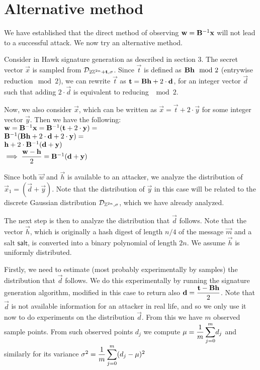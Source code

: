 \chapter{Alternative method}

We have established that the direct method of observing $\mathbf{w} = \mathbf{B}^{-1} \mathbf{x}$ will not lead to a successful attack.
We now try an alternative method.

Consider in Hawk signature generation as described in section 3.
The secret vector $\vec{x}$ is sampled from $\mathcal{D}_{2\mathbb{Z}^{2n} + \mathbf{t}, \sigma}$.
Since $\vec{t}$ is defined as $\mathbf{B}\mathbf{h}\mod 2$ (entrywise reduction$\mod 2$), we can rewrite $\vec{t}$ as $\mathbf{t} = \mathbf{B} \mathbf{h} + 2 \cdot \mathbf{d}$, 
for an integer vector $\vec{d}$ such that adding $2 \cdot \vec{d}$ is equivalent to reducing $\mod 2$.

Now, we also consider $\vec{x}$, which can be written as $\vec{x} = \vec{t} + 2 \cdot \vec{y}$ for some integer vector $\vec{y}$.
Then we have the following: \\ 
$\mathbf{w} = \mathbf{B}^{-1} \mathbf{x} = \mathbf{B}^{-1}(\mathbf{t} + 2 \cdot \mathbf{y}) =$ \\
$\mathbf{B}^{-1}(\mathbf{B} \mathbf{h} + 2 \cdot \mathbf{d} + 2 \cdot \mathbf{y}) =$ \\
$\mathbf{h} + 2\cdot \mathbf{B}^{-1}(\mathbf{d} + \mathbf{y}) $\\ 
$\implies \mathlarger{ \frac{\vec{w} - \vec{h}}{2}} = \mat{B}^{-1}(\vec{d} + \vec{y})$

Since both $\vec{w}$ and $\vec{h}$ is available to an attacker, we analyze the distribution of $\vec{x}_1 = (\vec{d} + \vec{y})$.
Note that the distribution of $\vec{y}$ in this case will be related to the discrete Gaussian distribution $\mathcal{D}_{\mathbb{Z}^{2n}, \sigma}$, which we have already analyzed.

The next step is then to analyze the distribution that $\vec{d}$ follows. Note that the vector $\vec{h}$, which is originally a hash digest of length $n / 4$ of the message $\vec{m}$ and a salt $\mathsf{salt}$, is converted into
a binary polynomial of length $2n$. We assume $\vec{h}$ is uniformly distributed.

Firstly, we need to estimate (most probably experimentally by samples) the distribution that $\vec{d}$ follows.
We do this experimentally by running the signature generation algorithm, modified in this case to return also $\vec{d} = \mathlarger{\frac{\vec{t}-\mat{B} \vec{h}}{2}}$.
Note that $\vec{d}$ is not available information for an attacker in real life, and so we only use it now to do experiments on the distribution $\vec{d}$.
From this we have $m$ observed sample points. From such observed points $d_j$ we compute 
$\mu = \mathlarger{\frac{1}{m} \sum_{j = 0}^{m}} d_j$ and similarly for its variance $\sigma^2 = \mathlarger{\frac{1}{m} \sum_{j = 0}^{m}} (d_j - \mu)^2$

